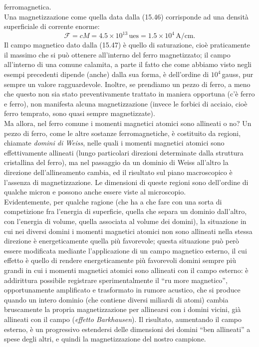 ferromagnetica.\\
Una magnetizzazione come quella data dalla (15.46) corrisponde ad una densit\`a
superficiale di corrente enorme:
\begin{equation}
  \mathcal F=cM=4.5\times10^{13}\,\mathrm{ues}=1.5\times10^4\,\mathrm{A/cm}.
  \tag{15.48}
\end{equation}
Il campo magnetico dato dalla (15.47) \`e quello di saturazione, cio\`e
praticamente il massimo che si pu\`o ottenere all'interno del ferro
magnetizzato; il campo all'interno di una comune calamita, a parte il fatto che
come abbiamo visto negli esempi precedenti dipende (anche) dalla sua forma, \`e
dell'ordine di $10^4\,$gauss, pur sempre un valore ragguardevole. Inoltre, se
prendiamo un pezzo di ferro, a meno che questo non sia stato preventivamente
trattato in maniera opportuna (c'\`e ferro e ferro), non manifesta alcuna
magnetizzazione (invece le forbici di acciaio, cio\`e ferro temprato, sono quasi
sempre magnetizzate).\\
Ma allora, nel ferro comune i momenti magnetici atomici sono allineati o no? Un
pezzo di ferro, come le altre sostanze ferromagnetiche, \`e costituito da
regioni, chiamate \textit{domini di Weiss}, nelle quali i momenti magnetici
atomici sono effettivamente allineati (lungo particolari direzioni determinate
dalla struttura cristallina del ferro), ma nel passaggio da un dominio di Weiss
all'altro la direzione dell'allineamento cambia, ed il risultato sul piano
macroscopico \`e l'assenza di magnetizzazione. Le dimensioni di queste regioni
sono dell'ordine di qualche micron e possono anche essere viste al
microscopio.\\
Evidentemente, per qualche ragione (che ha a che fare con una sorta di
competizione fra l'energia di superficie, quella che separa un dominio
dall'altro, con l'energia di volume, quella associata al volume dei domini), la
situazione in cui nei diversi domini i momenti magnetici atomici non sono
allineati nella stessa direzione \`e energeticamente quella pi\`u favorevole;
questa situazione pu\`o per\`o essere modificata mediante l'applicazione di un
campo magnetico esterno, il cui effetto \`e quello di rendere energeticamente
pi\`u favorevoli domini sempre pi\`u grandi in cui i momenti magnetici atomici
sono allineati con il campo esterno: \`e addirittura possibile registrare
sperimentalmente il ``ru\-
more magnetico'', opportunamente amplificato e trasformato in rumore acustico,
che si produce quando un intero dominio (che contiene diversi miliardi di atomi)
cambia bruscamente la propria magnetizzazione per allinearsi con i domini
vicini, gi\`a allineati con il campo (\textit{effetto Barkhausen}). Il
risultato, aumentando il campo esterno, \`e un progressivo estendersi delle
dimensioni dei domini ``ben allineati'' a spese degli altri, e quindi la
magnetizzazione del nostro campione.

